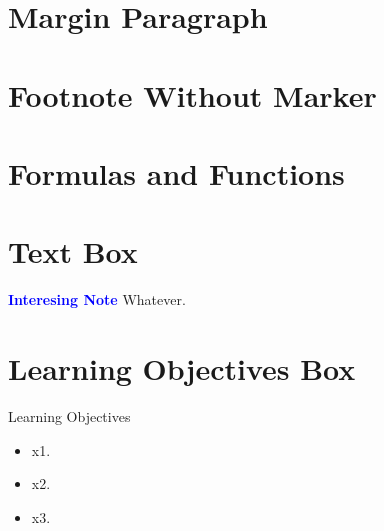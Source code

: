 \section{Margin Paragraph} 

\section{Footnote Without Marker} 

\section{Formulas and Functions}

\section{Text Box}
\begin{tcolorbox}[colback=blue!5!white,colframe=blue!75!black]
	\textcolor{blue}{\textbf{Interesing Note}}
	\tcblower
	Whatever.
\end{tcolorbox}

\section{Learning Objectives Box}
\begin{center}
	\begin{objbox}{Learning Objectives}
		\begin{itemize}
			\setlength{\itemsep}{0pt}
			\setlength{\parskip}{0pt}
			\setlength{\parsep}{0pt}
		
			\item x1.
			\item x2.
			\item x3.
		\end{itemize}
	\end{objbox}
\end{center}


